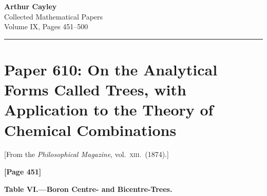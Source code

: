 \documentclass[11pt,a4paper]{article}
\begin{document}
\begin{center}
{\Large\bfseries Arthur Cayley}\\[6pt]
{\large Collected Mathematical Papers}\\[4pt]
{\normalsize Volume IX, Pages 451--500}\\[12pt]
\rule{0.6\textwidth}{0.4pt}
\end{center}

\tableofcontents
\newpage

\newcommand{\sectref}[1]{\textsection\,#1}
\newcommand{\qq}{\quad}

\section{Paper 610: On the Analytical Forms Called Trees, with Application to the Theory of Chemical Combinations}

\begin{center}
{\small[From the \textit{Philosophical Magazine}, vol.\ \textsc{xiii}.\ (1874).]}
\end{center}

\textbf{[Page 451]}

\begin{center}
\textbf{Table VI.---Boron Centre- and Bicentre-Trees.}
\end{center}
\end{document}
